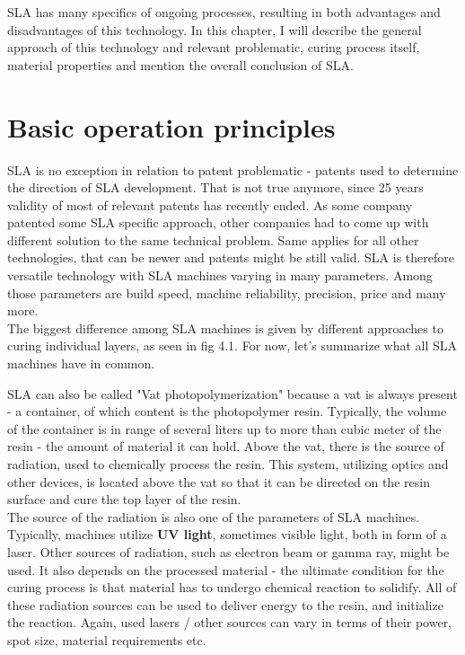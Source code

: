 \documentclass[a4paper, 11pt, reqno]{report}
\begin{document}
	SLA has many specifics of ongoing processes, resulting in both advantages and disadvantages of this technology. In this chapter, I will describe the general approach of this technology and relevant problematic, curing process itself, material properties and mention the overall conclusion of SLA.
\section{Basic operation principles}
SLA is no exception in relation to patent problematic - patents used to determine the direction of SLA development. That is not true anymore, since 25 years validity of most of relevant patents has recently ended. As some company patented some SLA specific approach, other companies had to come up with different solution to the same technical problem. Same applies for all other technologies, that can be newer and patents might be still valid. SLA is therefore versatile technology with SLA machines varying in many parameters. Among those parameters are build speed, machine reliability, precision, price and many more.\\
The biggest difference among SLA machines is given by different approaches to curing individual layers, as seen in fig 4.1. For now, let's summarize what all SLA machines have in common.

	SLA can also be called "Vat photopolymerization" because a vat is always present - a container, of which content is the photopolymer resin. Typically, the volume of the container is in range of several liters up to more than cubic meter of the resin - the amount of material it can hold. Above the vat, there is the source of radiation, used to chemically process the resin. This system, utilizing optics and other devices, is located above the vat so that it can be directed on the resin surface and cure the top layer of the resin.\\
The source of the radiation is also one of the parameters of SLA machines. Typically, machines utilize \textbf{UV light}, sometimes visible light, both in form of a laser. Other sources of radiation, such as electron beam or gamma ray, might be used. It also depends on the processed material - the ultimate condition for the curing process is that material has to undergo chemical reaction to solidify. All of these radiation sources can be used to deliver energy to the resin, and initialize the reaction. Again, used lasers / other sources can vary in terms of their power, spot size, material requirements etc.
\end{document}
